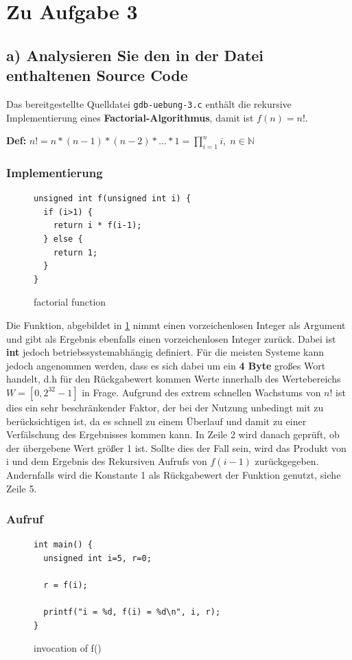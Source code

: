 \documentclass[12pt]{article}
\begin{document}
\newpage
\section{Zu Aufgabe 3}
\subsection{a) Analysieren Sie den in der Datei enthaltenen Source Code}
Das bereitgestellte Quelldatei \texttt{gdb-uebung-3.c} enthält die rekursive Implementierung eines \textbf{Factorial-Algorithmus}, damit ist $f(n) = n! $.

\textbf{Def:} $ n! = n * (n-1) * (n-2) * ... * 1 = \prod_{i = 1}^{n} i ,\;  n \in \mathbb{N} $

\subsubsection{Implementierung}
\begin{figure}[h]
\begin{lstlisting}
unsigned int f(unsigned int i) {
  if (i>1) {
    return i * f(i-1);
  } else {
    return 1;
  }
}
\end{lstlisting}
\label{fig:factorial}
\caption{factorial function}
\end{figure}

Die Funktion, abgebildet in \ref{fig:factorial} nimmt einen vorzeichenlosen Integer als Argument und gibt als Ergebnis ebenfalls einen vorzeichenlosen Integer zurück. Dabei ist \textbf{int} jedoch betriebssystemabhängig definiert. Für die meisten Systeme kann jedoch angenommen werden, dass es sich dabei um ein \textbf{4 Byte} großes Wort handelt, d.h für den Rückgabewert kommen Werte innerhalb des Wertebereichs $  W = [0,2^{32}-1] $ in Frage. Aufgrund des extrem schnellen Wachstums von $ n! $ ist dies ein sehr beschränkender Faktor, der bei der Nutzung unbedingt mit zu berücksichtigen ist, da es schnell zu einem Überlauf und damit zu einer Verfälschung des Ergebnisses kommen kann. In Zeile 2 wird danach geprüft, ob der übergebene Wert größer 1 ist. Sollte dies der Fall sein, wird das  Produkt von i und dem Ergebnis des Rekursiven Aufrufs von $ f(i-1) $ zurückgegeben. Andernfalls wird die Konstante 1 als Rückgabewert der Funktion genutzt, siehe Zeile 5.
\newpage

\subsubsection{Aufruf}
\begin{figure}[h]
\begin{lstlisting}
int main() {
  unsigned int i=5, r=0;

  r = f(i);

  printf("i = %d, f(i) = %d\n", i, r);
}
\end{lstlisting}
\label{fig:factorial-main}
\caption{invocation of f()}
\end{figure}
\end{document}
